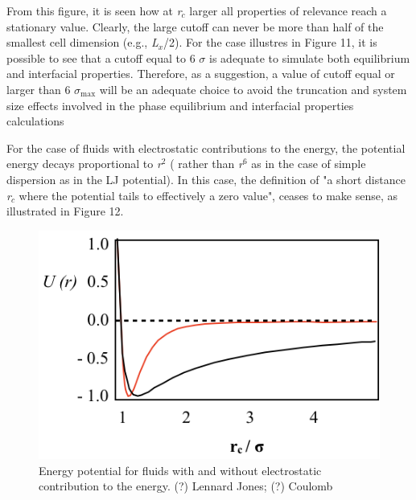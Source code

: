 \documentclass{scrbook}
\begin{document}
From this figure, it is seen how at  \textit{r}$_{c}$ larger all properties of
relevance reach a stationary value. Clearly, the large cutoff can never be more
than half of the smallest cell dimension (e.g., \textit{L}$_{x}$/2). For the
case illustres in Figure 11, it is possible to see that a cutoff equal to
6 ${\sigma}$  is adequate to simulate both equilibrium and interfacial
properties. Therefore, as a suggestion, a value of cutoff  equal or larger than
6 ${\sigma}$$_{\mathrm{max}}$ will be an adequate choice to avoid the
truncation and system size effects involved in the phase equilibrium and
interfacial properties calculations

For the case of fluids with electrostatic contributions to the energy, the
potential energy decays proportional to \textit{r}$^{2}$ ( rather than
\textit{r}$^{6}$ as in the case of simple dispersion as in the LJ potential).
In this case, the definition of "a short distance \textit{r}$_{c}$ where the
potential tails to effectively a zero value", ceases to make sense, as
illustrated in Figure 12. 

\begin{figure}
\includegraphics[width=1\textwidth]{gfx/image49.png}
\caption{Energy potential for fluids with and without electrostatic contribution to the energy. (\textcolor{color-3}{?}) Lennard \textendash{} Jones; (?) Coulomb}
\label{fig:6}
\end{figure}
\end{document}
